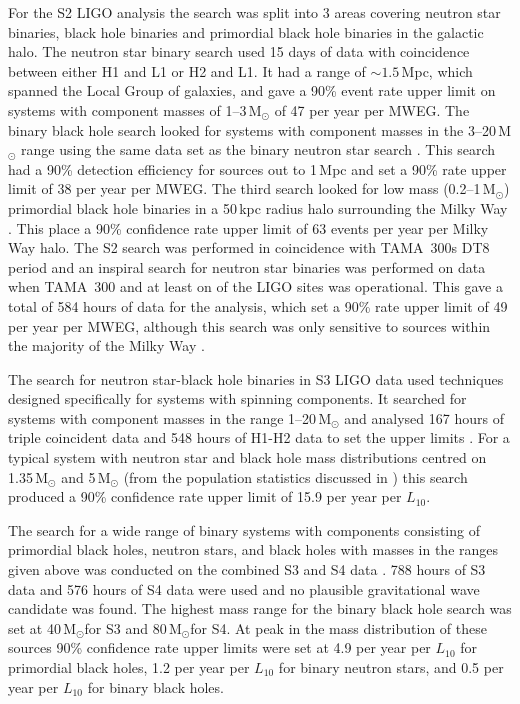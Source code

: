 \documentclass{article}
\newcommand{\Msun}{\,M$_{\odot}$}
\begin{document}
For the S2 LIGO analysis the search was split into 3 areas covering neutron star
binaries, black hole binaries and primordial black hole binaries in the galactic
halo. The neutron star binary search \cite{Abbott:2005b} used 15 days of data
with coincidence between either H1 and L1 or H2 and L1. It had a range of
$\sim1.5$\,Mpc, which spanned the Local Group of galaxies, and gave a 90\% event
rate upper limit on systems with component masses of 1--3\,M$_{\odot}$ of 47 per
year per MWEG. The binary black hole search looked for systems with component
masses in the 3--20\,M$_{\odot}$ range using the same data set as the binary
neutron star search \cite{Abbott:2006a}. This search had a 90\% detection
efficiency for sources out to 1\,Mpc and set a 90\% rate upper limit of 38 per
year per MWEG. The third search looked for low mass (0.2--1\,M$_{\odot}$)
primordial black hole binaries in a 50\,kpc radius halo surrounding the Milky
Way \cite{Abbott:2005e}. This place a 90\% confidence rate upper limit of 63
events per year per Milky Way halo. The S2 search was performed in coincidence
with TAMA~300s DT8 period and an inspiral search for neutron star binaries was
performed on data when TAMA~300 and at least on of the LIGO sites was
operational. This gave a total of 584 hours of data for the analysis, which set
a 90\% rate upper limit of 49 per year per MWEG, although this search was only
sensitive to sources within the majority of the Milky Way \cite{Abbott:2006b}.

The search for neutron star-black hole binaries in S3 LIGO data used techniques
designed specifically for systems with spinning components. It searched for
systems with component masses in the range 1--20\,M$_{\odot}$ and analysed 167
hours of triple coincident data and 548 hours of H1-H2 data to set the upper
limits \cite{Abbott:2008d}. For a typical system with neutron star and black
hole mass distributions centred on 1.35\,M$_{\odot}$ and 5\,M$_{\odot}$ (from
the population statistics discussed in \cite{Abbott:2008a}) this search produced
a 90\% confidence rate upper limit of 15.9 per year per $L_{10}$.

The search for a wide range of binary systems with components consisting of
primordial black holes, neutron stars, and black holes with masses in
the ranges given above was conducted on the combined S3 and S4 data
\cite{Abbott:2008a}. 788 hours of S3 data and 576 hours of S4 data were used
and no plausible gravitational wave candidate was found. The highest mass range
for the binary black hole search was set at 40\Msun for S3 and 80\Msun for S4.
At peak in the mass distribution of these sources 90\% confidence rate upper
limits were set at 4.9 per year per $L_{10}$ for primordial black holes, 1.2 per
year per $L_{10}$ for binary neutron stars, and 0.5 per year per $L_{10}$ for
binary black holes.
\end{document}
